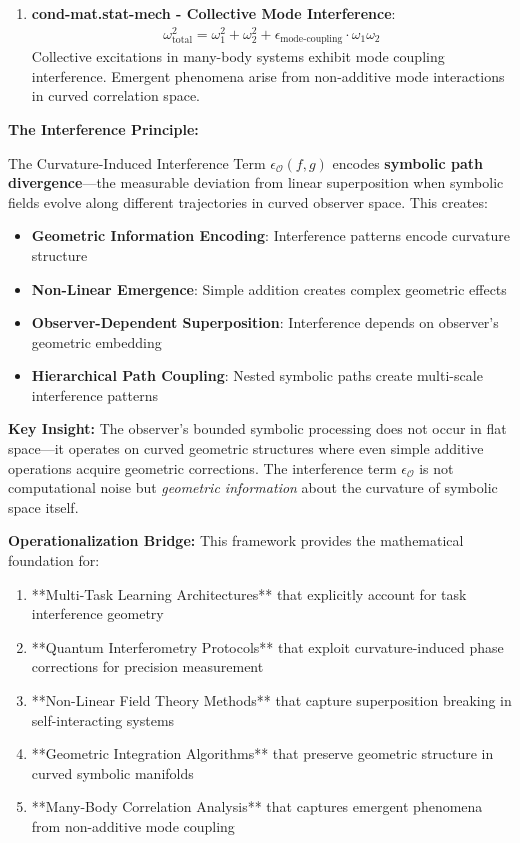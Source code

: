 \begin{scholium}
\begin{enumerate}
\item \textbf{cond-mat.stat-mech - Collective Mode Interference}:
   \begin{align}
   \omega_{\text{total}}^2 = \omega_1^2 + \omega_2^2 + \epsilon_{\text{mode-coupling}} \cdot \omega_1 \omega_2
   \end{align}
   Collective excitations in many-body systems exhibit mode coupling interference. Emergent phenomena arise from non-additive mode interactions in curved correlation space.
\end{enumerate}
\end{scholium}

\textbf{The Interference Principle:}

The Curvature-Induced Interference Term $\epsilon_{\mathcal{O}}(f, g)$ encodes \textbf{symbolic path divergence}—the measurable deviation from linear superposition when symbolic fields evolve along different trajectories in curved observer space. This creates:

\begin{itemize}
\item \textbf{Geometric Information Encoding}: Interference patterns encode curvature structure
\item \textbf{Non-Linear Emergence}: Simple addition creates complex geometric effects
\item \textbf{Observer-Dependent Superposition}: Interference depends on observer's geometric embedding
\item \textbf{Hierarchical Path Coupling}: Nested symbolic paths create multi-scale interference patterns
\end{itemize}

\textbf{Key Insight:} The observer's bounded symbolic processing does not occur in flat space—it operates on curved geometric structures where even simple additive operations acquire geometric corrections. The interference term $\epsilon_{\mathcal{O}}$ is not computational noise but \textit{geometric information} about the curvature of symbolic space itself.

\textbf{Operationalization Bridge:}
This framework provides the mathematical foundation for:
\begin{enumerate}
\item **Multi-Task Learning Architectures** that explicitly account for task interference geometry
\item **Quantum Interferometry Protocols** that exploit curvature-induced phase corrections for precision measurement
\item **Non-Linear Field Theory Methods** that capture superposition breaking in self-interacting systems
\item **Geometric Integration Algorithms** that preserve geometric structure in curved symbolic manifolds
\item **Many-Body Correlation Analysis** that captures emergent phenomena from non-additive mode coupling
\end{enumerate}

